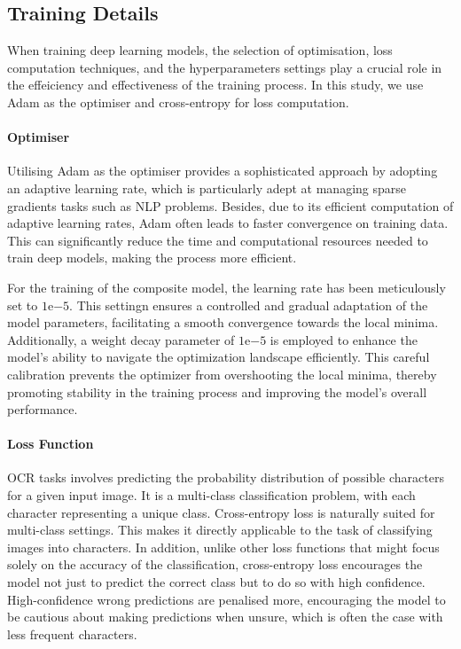 \subsection{Training Details}
\label{subsec:3_training_details}
When training deep learning models, the selection of optimisation, loss computation techniques, and the hyperparameters settings play a crucial role in the effeiciency and effectiveness of the training process. In this study, we use Adam as the optimiser and cross-entropy for loss computation.

\paragraph*{Optimiser}
\label{par:3_Optimiser}
Utilising Adam as the optimiser provides a sophisticated approach by adopting an adaptive learning rate, which is particularly adept at managing sparse gradients tasks such as NLP problems. Besides, due to its efficient computation of adaptive learning rates, Adam often leads to faster convergence on training data. This can significantly reduce the time and computational resources needed to train deep models, making the process more efficient.

For the training of the composite model, the learning rate has been meticulously set to $1\mathrm{e}{-5}$. This settingn ensures a controlled and gradual adaptation of the model parameters, facilitating a smooth convergence towards the local minima. Additionally, a weight decay parameter of $1\mathrm{e}{-5}$ is employed to enhance the model's ability to navigate the optimization landscape efficiently. This careful calibration prevents the optimizer from overshooting the local minima, thereby promoting stability in the training process and improving the model's overall performance.

\paragraph*{Loss Function}
\label{par:3_loss_function}
OCR tasks involves predicting the probability distribution of possible characters for a given input image. It is a multi-class classification problem, with each character representing a unique class. Cross-entropy loss is naturally suited for multi-class settings. This makes it directly applicable to the task of classifying images into characters. In addition, unlike other loss functions that might focus solely on the accuracy of the classification, cross-entropy loss encourages the model not just to predict the correct class but to do so with high confidence. High-confidence wrong predictions are penalised more, encouraging the model to be cautious about making predictions when unsure, which is often the case with less frequent characters.
